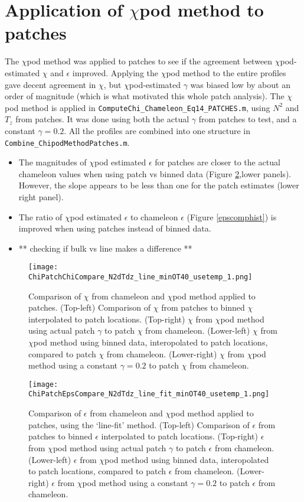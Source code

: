 \documentclass[11pt]{article}
\begin{document}
\clearpage
\section{Application of $\chi$pod method to patches}

The $\chi$pod method was applied to patches to see if the agreement between $\chi$pod-estimated $\chi$ and $\epsilon$ improved. Applying the $\chi$pod method to the entire profiles gave decent agreement in $\chi$, but $\chi$pod-estimated $\gamma$ was biased low by about an order of magnitude (which is what motivated this whole patch analysis).  The $\chi$pod method is applied in \verb+ComputeChi_Chameleon_Eq14_PATCHES.m+, using $N^2$ and $T_z$ from patches. It was done using both the actual $\gamma$ from patches to test, and a constant $\gamma=0.2$. All the profiles are combined into one structure in \verb+Combine_ChipodMethodPatches.m+.

\begin{itemize}
\item The magnitudes of $\chi$pod estimated $\epsilon$ for patches are closer to the actual chameleon values when using patch vs binned data (Figure \ref{epscomp2d},lower panels). However, the slope appears to be less than one for the patch estimates (lower right panel).
\item The ratio of $\chi$pod estimated $\epsilon$ to chameleon $\epsilon$ (Figure \ref{epscomphist}) is improved when using patches instead of binned data. 
\item ** checking if bulk vs line makes a difference **
\end{itemize}

\begin{figure}[htbp]
\texttt{[image: ChiPatchChiCompare\_N2dTdz\_line\_minOT40\_usetemp\_1.png]}
\caption{Comparison of $\chi$ from chameleon and $\chi$pod method applied to patches. (Top-left) Comparison of $\chi$ from patches to binned $\chi$ interpolated to patch locations. (Top-right) $\chi$ from $\chi$pod method using actual patch $\gamma$ to patch $\chi$ from chameleon. (Lower-left) $\chi$ from $\chi$pod method using binned data, interopolated to patch locations, compared to patch $\chi$ from chameleon. (Lower-right) $\chi$ from $\chi$pod method using a constant $\gamma=0.2$ to patch $\chi$ from chameleon.}
\label{chicomp2d}
\end{figure}


\begin{figure}[htbp]
\texttt{[image: ChiPatchEpsCompare\_N2dTdz\_line\_fit\_minOT40\_usetemp\_1.png]}
\caption{Comparison of $\epsilon$ from chameleon and $\chi$pod method applied to patches, using the `line-fit' method. (Top-left) Comparison of $\epsilon$ from patches to binned $\epsilon$ interpolated to patch locations. (Top-right) $\epsilon$ from $\chi$pod method using actual patch $\gamma$ to patch $\epsilon$ from chameleon. (Lower-left) $\epsilon$ from $\chi$pod method using binned data, interopolated to patch locations, compared to patch $\epsilon$ from chameleon. (Lower-right) $\epsilon$ from $\chi$pod method using a constant $\gamma=0.2$ to patch $\epsilon$ from chameleon.}
\label{epscomp2d}
\end{figure}
\end{document}
